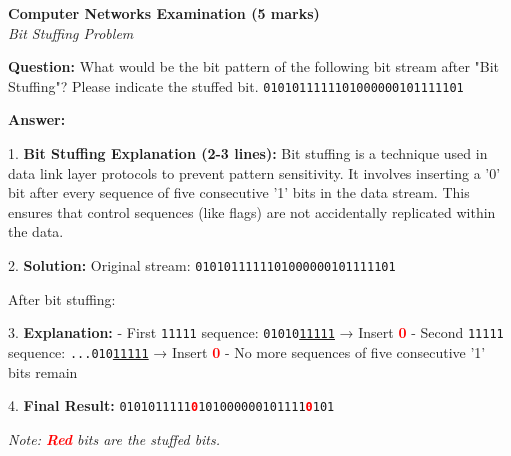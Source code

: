 \documentclass[12pt,a4paper]{article}
\newcommand{\bitstuff}[1]{\textcolor{red}{\textbf{#1}}}
\begin{document}
\begin{center}
\textbf{Computer Networks Examination (5 marks)}
\\\vspace{0.25cm}
\textit{Bit Stuffing Problem}
\end{center}

\textbf{Question:} What would be the bit pattern of the following bit stream after "Bit Stuffing"? Please indicate the stuffed bit. \texttt{0101011111101000000101111101}

\textbf{Answer:}

1. \textbf{Bit Stuffing Explanation (2-3 lines):}
   Bit stuffing is a technique used in data link layer protocols to prevent pattern sensitivity. It involves inserting a '0' bit after every sequence of five consecutive '1' bits in the data stream. This ensures that control sequences (like flags) are not accidentally replicated within the data.

2. \textbf{Solution:}
   Original stream: \texttt{0101011111101000000101111101}
   
   After bit stuffing:
   \begin{center}
   \end{center}

3. \textbf{Explanation:}
   - First \texttt{11111} sequence: \texttt{01010\underline{11111}} → Insert \bitstuff{0}
   - Second \texttt{11111} sequence: \texttt{...010\underline{11111}} → Insert \bitstuff{0}
   - No more sequences of five consecutive '1' bits remain

4. \textbf{Final Result:}
   \texttt{0101011111\bitstuff{0}101000000101111\bitstuff{0}101}

   \textit{Note: \textcolor{red}{\textbf{Red}} bits are the stuffed bits.}
\end{document}
